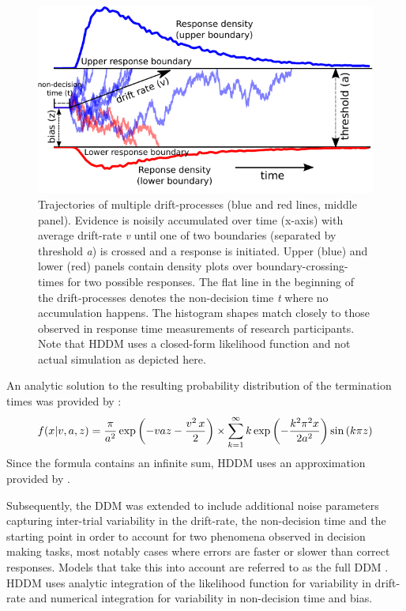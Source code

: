 \documentclass[letterpaper,10pt,english]{article}
\begin{document}
\begin{figure}
\centering
\capstart

\includegraphics{DDM.pdf}
\caption{Trajectories of multiple drift-processes (blue and red lines,
middle panel). Evidence is noisily accumulated over time (x-axis) with
average drift-rate \textit{v} until one of two boundaries (separated
by threshold \textit{a}) is crossed and a response is initiated. Upper
(blue) and lower (red) panels contain density plots over
boundary-crossing-times for two possible responses. The flat line in
the beginning of the drift-processes denotes the non-decision time
\textit{t} where no accumulation happens. The histogram shapes match
closely to those observed in response time measurements of research
participants. Note that HDDM uses a closed-form likelihood function
and not actual simulation as depicted here.}
\label{fig.ddm}
\end{figure}

An analytic solution to the resulting probability distribution of
the termination times was provided by \citet{Wald47,Feller68}:
\begin{gather}
\begin{split}f(x|v, a, z) = \frac{\pi}{a^2} \, \text{exp} \left(
-vaz-\frac{v^2\,x}{2} \right) \times \sum_{k=1}^{\infty} k\,
\text{exp} \left( -\frac{k^2\pi^2 x}{2a^2} \right)
\text{sin}\left(k\pi z\right)\end{split}\notag
\end{gather}
Since the formula contains an infinite sum, HDDM uses an approximation
provided by \citep{NavarroFuss09}.

Subsequently, the DDM was extended to include additional noise parameters capturing inter-trial variability in the drift-rate, the non-decision time and the starting point in order to account for two phenomena observed in decision making tasks, most notably cases where errors are faster or slower than correct responses. Models that take this into account are referred to as the full DDM \citep{RatcliffRouder98}. HDDM uses analytic integration of the likelihood function for variability in drift-rate \cite{TODO} and numerical integration for variability in non-decision time and bias.
\end{document}
